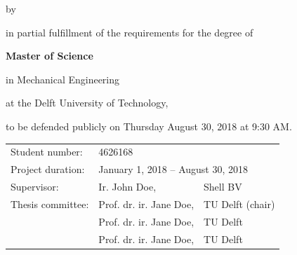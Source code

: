 
\begin{titlepage}

\begin{center}


\vspace*{2\bigskipamount}

{\huge\bfseries \thetitle \par}

\bigskip
\bigskip

by

\bigskip
\bigskip

{\makeatletter
{\Large\bfseries \theauthor \par}
\makeatother}

\vfill

in partial fulfillment of the requirements for the degree of

\bigskip
\bigskip

{\bfseries Master of Science}

in Mechanical Engineering

\bigskip
\bigskip

at the Delft University of Technology,

to be defended publicly on Thursday August 30, 2018 at 9:30 AM.

\vfill

\begin{tabular}{lll}
    Student number: & 4626168 \\
    Project duration: & \multicolumn{2}{l}{January 1, 2018 -- August 30, 2018} \\
    Supervisor: & Ir. John Doe, & Shell BV \\
    Thesis committee:
        & Prof. dr. ir. Jane Doe, & TU Delft (chair)\\
        & Prof. dr. ir. Jane Doe, & TU Delft \\
        & Prof. dr. ir. Jane Doe, & TU Delft \\
\end{tabular}


\end{center}
\end{titlepage}
